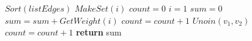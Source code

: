 \State $Sort(listEdges)$
    \State $MakeSet(i)$
\EndFor
\State $count=0$
\State $i=1$
\State $sum=0$
        \State \textbf{$sum=sum+GetWeight(i)$}
        \State \textbf{$count =count+1$}
        \State \textbf{$Unoin(v_1,v_2)$}
    \EndIf
    \State \textbf{$count =count+1$}
\EndWhile
\State \textbf{return} sum
\EndProcedure